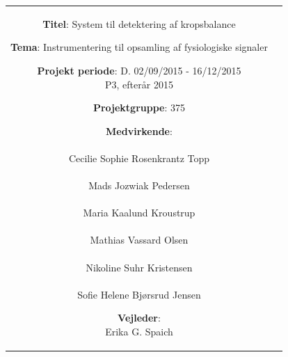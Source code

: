 \begin{nopagebreak}
{\begin{tabular}{cc}
\parbox{7cm}{
\begin{description}
{\setlength{\parindent}{0cm}
\item \textbf{Titel}: System til detektering af kropsbalance \\
\item \textbf{Tema}: Instrumentering til opsamling af fysiologiske signaler\\
\item \textbf{Projekt periode}: D. 02/09/2015 - 16/12/2015\\
   P3, efterår 2015\\
  \hspace{4cm}
\item \textbf{Projektgruppe}: 375 \\
  \hspace{4cm}
\item \textbf{Medvirkende}:\\
\underline{\hspace{4cm}}\\
Cecilie Sophie Rosenkrantz Topp  \\
\underline{\hspace{4cm}}\\
Mads Jozwiak Pedersen \\
\underline{\hspace{4cm}}\\
Maria Kaalund Kroustrup \\
\underline{\hspace{4cm}}\\
Mathias Vassard Olsen \\
\underline{\hspace{4cm}}\\
Nikoline Suhr Kristensen \\
\underline{\hspace{4cm}}\\
Sofie Helene Bjørsrud Jensen \\
\hspace{2cm}
\item \textbf{Vejleder}:\\
Erika G. Spaich  \\
}
  
\end{description}

}
\end{tabular}}
\end{nopagebreak}
